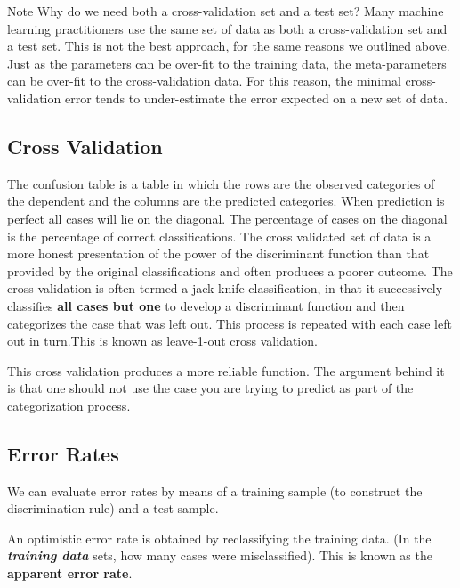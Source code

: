 \documentclass[12pt]{article}
\begin{document}
Note Why do we need both a cross-validation set and a test set? Many machine learning practitioners use the same set of data as both a cross-validation set and a test set. This is not the best approach, for the same reasons we outlined above. Just as the parameters can be over-fit to the training data, the meta-parameters can be over-fit to the cross-validation data. For this reason, the minimal cross-validation error tends to under-estimate the error expected on a new set of data.


\subsection{Cross Validation}

The confusion
table is a table in which the rows are the observed categories of the dependent and
the columns are the predicted categories. When prediction is perfect all cases will lie on the
diagonal. The percentage of cases on the diagonal is the percentage of correct classifications. 
The cross validated set of data is a more honest presentation of the power of the
discriminant function than that provided by the original classifications and often produces
a poorer outcome. The cross validation is often termed a jack-knife classification, in that
it successively classifies \textbf{all cases but one} to develop a discriminant function and then
categorizes the case that was left out. This process is repeated with each case left out in
turn.This is known as leave-1-out cross validation. 

This cross validation produces a more reliable function. The argument behind it is that
one should not use the case you are trying to predict as part of the categorization process.


\subsection{Error Rates}

We can evaluate error rates by means of a training sample (to construct the discrimination rule) and a test sample.


An optimistic error rate is obtained by reclassifying the training data. (In the \textbf{\textit{training data}} sets, how many cases were misclassified). This is known as the \textbf{apparent error rate}.
\end{document}
